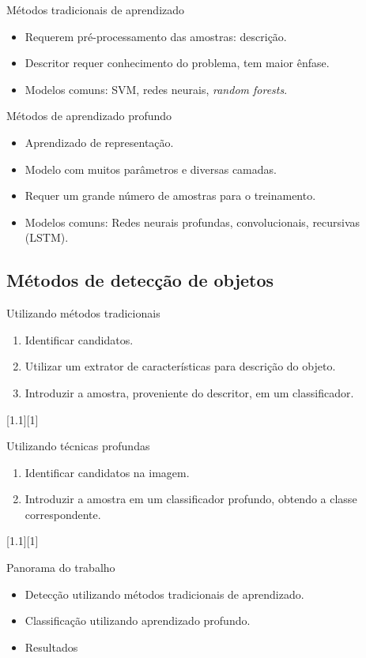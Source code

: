 	\begin{frame}{Métodos tradicionais de aprendizado}
		\begin{itemize}
			\item Requerem pré-processamento das amostras: descrição.
			\item Descritor requer conhecimento do problema, tem maior ênfase.
			\item Modelos comuns: SVM, redes neurais, \emph{random forests}.
		\end{itemize}
	\end{frame}

	\begin{frame}{Métodos de aprendizado profundo}
		\begin{itemize}
			\item Aprendizado de representação.
			\item Modelo com muitos parâmetros e diversas camadas.
			\item Requer um grande número de amostras para o treinamento.
			\item Modelos comuns: Redes neurais profundas, convolucionais, recursivas (LSTM).
		\end{itemize}
	\end{frame}

\subsection{Métodos de detecção de objetos}
	\begin{frame}{Utilizando métodos tradicionais}
	\begin{enumerate}
	\item Identificar candidatos.
	\item Utilizar um extrator de características para descrição do objeto.
	\item Introduzir a amostra, proveniente do descritor, em um classificador.
	\end{enumerate}

	[1.1][1]
	\end{frame}

	\begin{frame}{Utilizando técnicas profundas}
	\begin{enumerate}
	\item Identificar candidatos na imagem.
	\item Introduzir a amostra em um classificador profundo, obtendo a classe correspondente.
	\end{enumerate}

	[1.1][1]
	\end{frame}

	\begin{frame}{Panorama do trabalho}
		\begin{itemize}
			\item Detecção utilizando métodos tradicionais de aprendizado.
			\item Classificação utilizando aprendizado profundo.
			\item Resultados
		\end{itemize}
	\end{frame}

